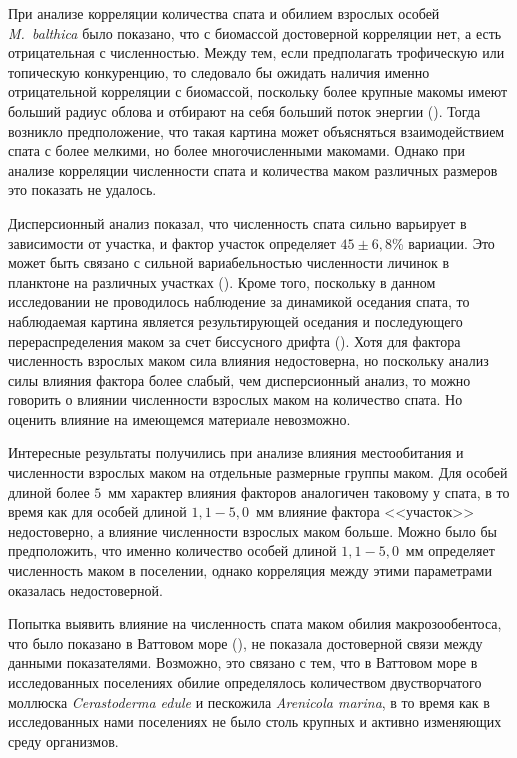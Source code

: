 При анализе корреляции количества спата и обилием взрослых особей \textit{M.~balthica} было показано, что с биомассой достоверной корреляции нет, а есть отрицательная с численностью. 
Между тем, если предполагать трофическую или топическую конкуренцию, то следовало бы ожидать наличия именно отрицательной корреляции с биомассой, поскольку более крупные макомы имеют больший радиус облова и отбирают на себя больший поток энергии (\cite{Olafsson_1989, Zwarts_et_al_1994}). 
Тогда возникло предположение, что такая картина может объясняться взаимодействием спата с более мелкими, но более многочисленными макомами. 
Однако при анализе корреляции численности спата и количества маком различных размеров это показать не удалось.

Дисперсионный анализ показал, что численность спата сильно варьирует в зависимости от участка, и фактор участок определяет $45 \pm 6,8$\% вариации. 
Это может быть связано с сильной вариабельностью численности личинок в планктоне на различных участках (\cite{Maximovich_Shilin_2012}). 
Кроме того, поскольку в данном исследовании не проводилось наблюдение за динамикой оседания спата, то наблюдаемая картина является результирующей оседания и последующего перераспределения маком за счет биссусного дрифта (\cite{Armonies_Hellwig-Armonies_1992, Huxham_Richards_2003}).
Хотя для фактора численность взрослых маком сила влияния недостоверна, но поскольку анализ силы влияния фактора более слабый, чем дисперсионный анализ, то можно говорить о влиянии численности взрослых маком на количество спата. Но оценить влияние на имеющемся материале невозможно.

Интересные результаты получились при анализе влияния местообитания и численности взрослых маком на отдельные размерные группы маком. 
Для особей длиной более $5$~мм характер влияния факторов аналогичен таковому у спата, в то время как для особей длиной $1,1 - 5,0$~мм влияние фактора <<участок>> недостоверно, а влияние численности взрослых маком больше. 
Можно было бы предположить, что именно количество особей длиной $1,1 - 5,0$~мм определяет численность маком в поселении, однако корреляция между этими параметрами оказалась недостоверной.

Попытка выявить влияние на численность спата маком обилия макрозообентоса, что было показано в Ваттовом море (\cite{Flatch_2003}), не показала достоверной связи между данными показателями. 
Возможно, это связано с тем, что в Ваттовом море в исследованных поселениях обилие определялось количеством двустворчатого моллюска \textit{Cerastoderma edule} и пескожила \textit{Arenicola marina}, в то время как в исследованных нами поселениях не было столь крупных и активно изменяющих среду организмов. 

